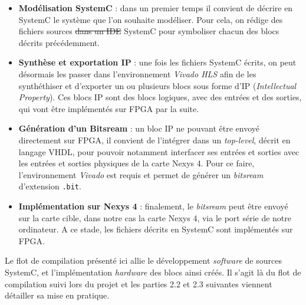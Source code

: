 \documentclass[a4paper,12pt]{article}
\begin{document}
	\begin{itemize}
		\item[\textbullet] \textbf{Modélisation SystemC} : dans un premier temps il convient de décrire en SystemC le système que l'on souhaite modéliser. Pour cela, on rédige des fichiers sources \sout{dans un IDE} SystemC pour symboliser chacun des blocs décrits précédemment. \\
		\item[\textbullet] \textbf{Synthèse et exportation IP} : une fois les fichiers SystemC écrits, on peut désormais les passer dans l'environnement \textit{Vivado HLS} afin de les synthéthiser et d'exporter un ou plusieurs blocs sous forme d'IP (\textit{Intellectual Property}). Ces blocs IP sont des blocs logiques, avec des entrées et des sorties, qui vont être implémentés sur FPGA par la suite. \\
		\item[\textbullet] \textbf{Génération d'un Bitsream} : un bloc IP ne pouvant être envoyé directement sur FPGA, il convient de l'intégrer dans un \textit{top-level}, décrit en langage VHDL, pour pouvoir notamment interfacer ses entrées et sorties avec les entrées et sorties physiques de la carte Nexys 4. Pour ce faire, l'environnement \textit{Vivado} est requis et permet de générer un \textit{bitsream} d'extension \texttt{.bit}. \\
		\item[\textbullet] \textbf{Implémentation sur Nexys 4} : finalement, le \textit{bitsream} peut être envoyé sur la carte cible, dans notre cas la carte Nexys 4, via le port série de notre ordinateur. A ce stade, les fichiers décrits en SystemC sont implémentés sur FPGA.\\
	\end{itemize}
	Le flot de compilation présenté ici allie le développement \textit{software} de sources SystemC, et l'implémentation \textit{hardware} des blocs ainsi créés. Il s'agit là du flot de compilation suivi lors du projet et les parties 2.2 et 2.3 suivantes viennent détailler sa mise en pratique.
\end{document}
